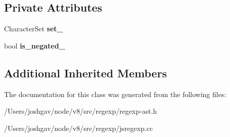 \subsection*{Private Attributes}
\begin{DoxyCompactItemize}
\item 
Character\+Set {\bfseries set\+\_\+}\hypertarget{classv8_1_1internal_1_1_reg_exp_character_class_a1d74030e2b2e762d561cdd5a0f340fb5}{}\label{classv8_1_1internal_1_1_reg_exp_character_class_a1d74030e2b2e762d561cdd5a0f340fb5}

\item 
bool {\bfseries is\+\_\+negated\+\_\+}\hypertarget{classv8_1_1internal_1_1_reg_exp_character_class_a96c43918ee52b69f36f305209ff1ce85}{}\label{classv8_1_1internal_1_1_reg_exp_character_class_a96c43918ee52b69f36f305209ff1ce85}

\end{DoxyCompactItemize}
\subsection*{Additional Inherited Members}


The documentation for this class was generated from the following files\+:\begin{DoxyCompactItemize}
\item 
/\+Users/joshgav/node/v8/src/regexp/regexp-\/ast.\+h\item 
/\+Users/joshgav/node/v8/src/regexp/jsregexp.\+cc\end{DoxyCompactItemize}
